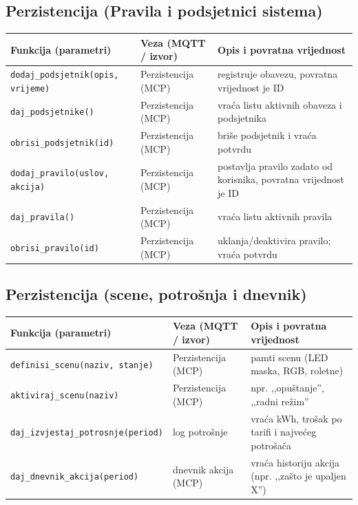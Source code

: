 \documentclass[11pt,a4paper]{article}
\begin{document}
\subsection{Perzistencija (Pravila i podsjetnici sistema)}
\begin{tabularx}{\textwidth}{@{}L{0.32\textwidth} L{0.26\textwidth} X@{}}
      \toprule
      \textbf{Funkcija (parametri)}             & \textbf{Veza (MQTT / izvor)} & \textbf{Opis i povratna vrijednost}                              \\
      \midrule
      \texttt{dodaj\_podsjetnik(opis, vrijeme)} & Perzistencija (MCP)          & registruje obavezu, povratna vrijednost je ID                    \\
      \texttt{daj\_podsjetnike()}               & Perzistencija (MCP)          & vraća listu aktivnih obaveza i podsjetnika                       \\
      \texttt{obrisi\_podsjetnik(id)}           & Perzistencija (MCP)          & briše podsjetnik i vraća potvrdu                                 \\
      \texttt{dodaj\_pravilo(uslov, akcija)}    & Perzistencija (MCP)          & postavlja pravilo zadato od korisnika, povratna vrijednost je ID \\
      \texttt{daj\_pravila()}                   & Perzistencija (MCP)          & vraća listu aktivnih pravila                                     \\
      \texttt{obrisi\_pravilo(id)}              & Perzistencija (MCP)          & uklanja/deaktivira pravilo; vraća potvrdu                        \\
      \bottomrule
\end{tabularx}

\subsection{Perzistencija (scene, potrošnja i dnevnik)}
\begin{tabularx}{\textwidth}{@{}L{0.32\textwidth} L{0.26\textwidth} X@{}}
      \toprule
      \textbf{Funkcija (parametri)}              & \textbf{Veza (MQTT / izvor)} & \textbf{Opis i povratna vrijednost}                  \\
      \midrule
      \texttt{definisi\_scenu(naziv, stanje)}    & Perzistencija (MCP)          & pamti scenu (LED maska, RGB, roletne)                \\
      \texttt{aktiviraj\_scenu(naziv)}           & Perzistencija (MCP)          & npr. ,,opuštanje'', ,,radni režim''                  \\
      \texttt{daj\_izvjestaj\_potrosnje(period)} & log potrošnje                & vraća kWh, trošak po tarifi i najvećeg potrošača     \\
      \texttt{daj\_dnevnik\_akcija(period)}      & dnevnik akcija (MCP)         & vraća historiju akcija (npr. ,,zašto je upaljen X'') \\
      \bottomrule
\end{tabularx}
\end{document}

